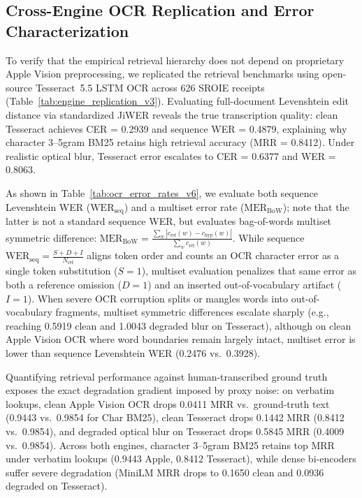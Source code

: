 \documentclass[conference]{IEEEtran}
\begin{document}
\subsection{Cross-Engine OCR Replication and Error Characterization}
\label{sec:cross_engine_replication}

To verify that the empirical retrieval hierarchy does not depend on proprietary Apple Vision preprocessing, we replicated the retrieval benchmarks using open-source Tesseract~5.5 LSTM OCR across 626 SROIE receipts (Table~\ref{tab:engine_replication_v3}). Evaluating full-document Levenshtein edit distance via standardized JiWER \cite{vaessen2024jiwer} reveals the true transcription quality: clean Tesseract achieves CER = 0.2939 and sequence WER = 0.4879, explaining why character 3--5gram BM25 retains high retrieval accuracy (MRR = 0.8412). Under realistic optical blur, Tesseract error escalates to CER = 0.6377 and WER = 0.8063.

As shown in Table~\ref{tab:ocr_error_rates_v6}, we evaluate both sequence Levenshtein WER ($\text{WER}_{\text{seq}}$) and a multiset error rate ($\text{MER}_{\text{BoW}}$); note that the latter is not a standard sequence WER, but evaluates bag-of-words multiset symmetric difference: $\text{MER}_{\text{BoW}} = \frac{\sum_w |c_{\text{ref}}(w) - c_{\text{hyp}}(w)|}{\sum_w c_{\text{ref}}(w)}$. While sequence $\text{WER}_{\text{seq}} = \frac{S + D + I}{N_{\text{ref}}}$ aligns token order and counts an OCR character error as a single token substitution ($S=1$), multiset evaluation penalizes that same error as both a reference omission ($D=1$) and an inserted out-of-vocabulary artifact ($I=1$). When severe OCR corruption splits or mangles words into out-of-vocabulary fragments, multiset symmetric differences escalate sharply (e.g., reaching 0.5919 clean and 1.0043 degraded blur on Tesseract), although on clean Apple Vision OCR where word boundaries remain largely intact, multiset error is lower than sequence Levenshtein WER (0.2476 vs.\ 0.3928).

Quantifying retrieval performance against human-transcribed ground truth exposes the exact degradation gradient imposed by proxy noise: on verbatim lookups, clean Apple Vision OCR drops 0.0411 MRR vs.\ ground-truth text (0.9443 vs.\ 0.9854 for Char BM25), clean Tesseract drops 0.1442 MRR (0.8412 vs.\ 0.9854), and degraded optical blur on Tesseract drops 0.5845 MRR (0.4009 vs.\ 0.9854). Across both engines, character 3--5gram BM25 retains top MRR under verbatim lookups (0.9443 Apple, 0.8412 Tesseract), while dense bi-encoders suffer severe degradation (MiniLM MRR drops to 0.1650 clean and 0.0936 degraded on Tesseract).
\end{document}
